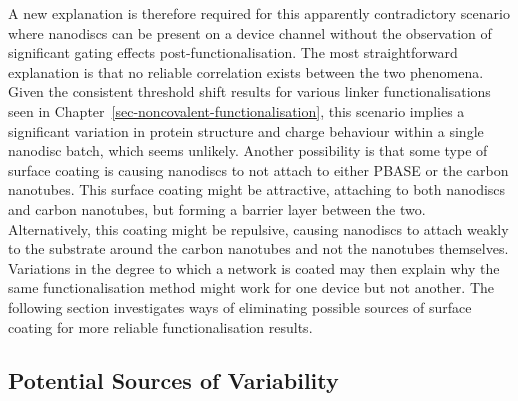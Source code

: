 \documentclass[
  a4paper,
]{scrbook}
\begin{document}
A new explanation is therefore required for this apparently
contradictory scenario where nanodiscs can be present on a device
channel without the observation of significant gating effects
post-functionalisation. The most straightforward explanation is that no
reliable correlation exists between the two phenomena. Given the
consistent threshold shift results for various linker functionalisations
seen in Chapter~\ref{sec-noncovalent-functionalisation}, this scenario
implies a significant variation in protein structure and charge
behaviour within a single nanodisc batch, which seems unlikely. Another
possibility is that some type of surface coating is causing nanodiscs to
not attach to either PBASE or the carbon nanotubes. This surface coating
might be attractive, attaching to both nanodiscs and carbon nanotubes,
but forming a barrier layer between the two. Alternatively, this coating
might be repulsive, causing nanodiscs to attach weakly to the substrate
around the carbon nanotubes and not the nanotubes themselves. Variations
in the degree to which a network is coated may then explain why the same
functionalisation method might work for one device but not another. The
following section investigates ways of eliminating possible sources of
surface coating for more reliable functionalisation results.

\hypertarget{sec-contamination}{%
\subsection{Potential Sources of Variability}\label{sec-contamination}}
\end{document}
